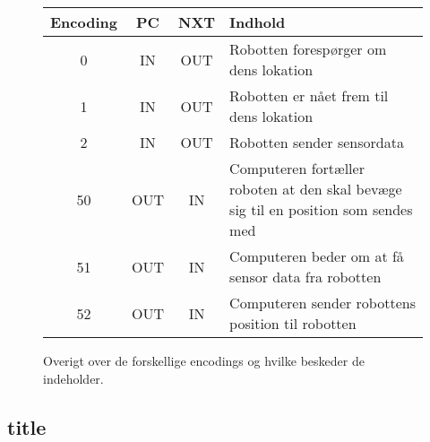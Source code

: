 \begin{figure}[h]
\begin{longtable}{ c | c | c | p{}}
Encoding & PC & NXT & Indhold\\
\hline
\hline
0 & IN & OUT & Robotten forespørger om dens lokation \\
1 & IN & OUT & Robotten er nået frem til dens lokation \\
2 & IN & OUT & Robotten sender sensordata \\
50 & OUT & IN & Computeren fortæller roboten at den skal bevæge sig til en position som sendes med\\
51 & OUT & IN & Computeren beder om at få sensor data fra robotten \\
52 & OUT & IN & Computeren sender robottens position til robotten \\
\end{longtable}
\label{design:protokol_tabel}
\caption{Overigt over de forskellige encodings og hvilke beskeder de indeholder.}
\end{figure}

\subsection{title}